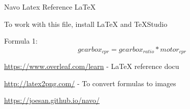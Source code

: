 \documentclass{article}
\begin{document}
Navo Latex Reference \LaTeX

To work with this file, install LaTeX and TeXStudio

Formula 1:
\[ gearbox_{cpr} = gearbox_{ratio} * motor_{cpr} \]

\url{https://www.overleaf.com/learn} - LaTeX reference docu

\url{http://latex2png.com/} - To convert formulas to images

\url{https://joesan.github.io/navo/}
\end{document}
